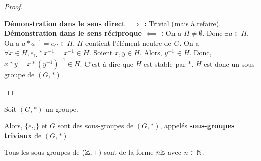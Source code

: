 \documentclass[12pt,a4paper]{report}
\begin{document}
\begin{proof}
    \begin{outline}
        \1 \textbf{Démonstration dans le sens direct $\implies$ :} Trivial (mais à refaire).
        \1 \textbf{Démonstration dans le sens réciproque $\impliedby$ :}
            \2 On a $H\ne \emptyset$.
            \2 Donc $\exists a \in H$.
            \2 On a $a*a^{-1} = \boxed{e_G \in H}$.
                \3 $H$ contient l'élément neutre de $G$.
            \2 On a $\forall x \in H, e_G * x^{-1} = x^{-1} \in H$.
            \2 Soient $x,y\in H$. Alors, $y^{-1} \in H$.
            \2 Donc, $x*y = x*(y^{-1})^{-1} \in H$.
                \3 C'est-à-dire que $H$ est stable par $*$.
            \2 $H$ est donc un sous-groupe de $(G,*)$.
    \end{outline}
\end{proof}

\begin{property}
    Soit $(G,*)$ un groupe.

    Alors, $\{e_G\}$ et $G$ sont des sous-groupes de $(G,*)$, appelés \textbf{sous-groupes triviaux} de $(G,*)$.
\end{property}

\begin{property}
    Tous les sous-groupes de $(\mathbb{Z},+)$ sont de la forme $n\mathbb{Z}$ avec $n\in\mathbb{N}$.
\end{property}
\end{document}
